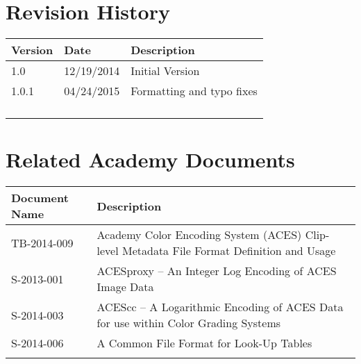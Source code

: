 \prelimsectionformat	%
\chapter{Revision History}

\begin{tabularx}{\linewidth}{|l|l|X|}
    \hline
    Version & Date       & Description \\ \hline
    1.0     & 12/19/2014 & Initial Version
    \\ \hline
    1.0.1   & 04/24/2015 & Formatting and typo fixes \\ \hline
    &   &   \\ \hline
    &   &   \\ \hline
    &   &   \\ \hline
    &   &   \\ \hline
\end{tabularx}

\vspace{0.25in} %
\chapter{Related Academy Documents} %
\begin{tabularx}{\linewidth}{|l|X|}
    \hline
    Document Name & Description \\ \hline
    TB-2014-009 & Academy Color Encoding System (ACES) Clip-level Metadata File Format Definition and Usage \\ \hline
    S-2013-001 & ACESproxy -- An Integer Log Encoding of ACES Image Data \\ \hline
    S-2014-003 & ACEScc -- A Logarithmic Encoding of ACES Data for use within Color Grading Systems \\ \hline
    S-2014-006 & A Common File Format for Look-Up Tables \\ \hline
    & \\ \hline
\end{tabularx}